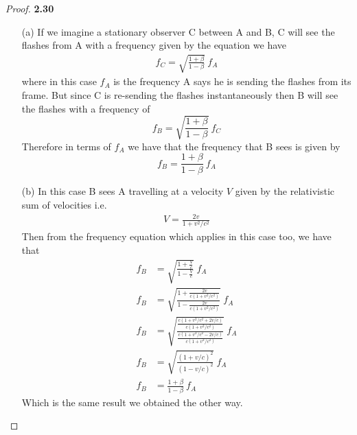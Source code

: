 \documentclass[11pt]{article}
\theoremstyle{definition}
\begin{document}
	\begin{proof}{\textbf{2.30}}
        \begin{itemize}
        \item [(a)] If we imagine a stationary observer C between A and B, C will see
        the flashes from A with a frequency given by the equation we have
        \begin{align*}
            f_C = \sqrt{\frac{1+\beta}{1-\beta}}~f_A
        \end{align*} 
        where in this case $f_A$ is the frequency A says he is sending the flashes from
        its frame. But since C is re-sending the flashes instantaneously then B will
        see the flashes with a frequency of
        $$f_B = \sqrt{\frac{1+\beta}{1-\beta}}~f_C$$ 
        Therefore in terms of $f_A$ we have that the frequency that B sees is given by
        $$f_B = \frac{1+\beta}{1-\beta}~f_A$$

        \item [(b)] In this case B sees A travelling at a velocity $V$ given by the 
        relativistic sum of velocities i.e.
        \begin{align*}
            V = \frac{2v}{1+v^2/c^2}
        \end{align*}
        Then from the frequency equation which applies in this case too, we have that
        \begin{align*}
            f_B &= \sqrt{\frac{1 + \frac{V}{c}}{1 - \frac{V}{c}}}~f_A\\
            f_B &= \sqrt{\frac{1 + \frac{2v}{c(1+v^2/c^2)}}{1 - \frac{2v}{c(1+v^2/c^2)}}}~f_A\\
            f_B &= \sqrt{\frac{\frac{c(1+v^2/c^2 + 2v/c)}{c(1+v^2/c^2)}}
            {\frac{c(1+v^2/c^2 - 2v/c)}{c(1+v^2/c^2)}}}~f_A\\
            f_B &= \sqrt{\frac{(1+v/c)^2}{(1-v/c)^2}}~f_A\\
            f_B &= \frac{1+\beta}{1 - \beta}~f_A
        \end{align*}
        Which is the same result we obtained the other way.
        \end{itemize}
    \end{proof}
\cleardoublepage
\end{document}
